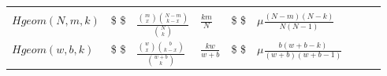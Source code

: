 \documentclass[]{tufte-book}
\begin{document}
\begin{longtable}[]{@{}lllllllll@{}}
\begin{minipage}[t]{0.08\columnwidth}
\strut
\end{minipage}\tabularnewline
\begin{minipage}[t]{0.08\columnwidth}\raggedright
\(Hgeom(N,m,k)\)\strut
\end{minipage} & \begin{minipage}[t]{0.08\columnwidth}\raggedright
\$ \$\strut
\end{minipage} & \begin{minipage}[t]{0.08\columnwidth}\raggedright
\(\frac{\binom{m}{x}\binom{N-m}{k-x}}{\binom{N}{k}}\)\strut
\end{minipage} & \begin{minipage}[t]{0.08\columnwidth}\raggedright
\(\frac{km}{N}\)\strut
\end{minipage} & \begin{minipage}[t]{0.08\columnwidth}\raggedright
\$ \$\strut
\end{minipage} & \begin{minipage}[t]{0.08\columnwidth}\raggedright
\(\mu\frac{(N-m)(N-k)}{N(N-1)}\)\strut
\end{minipage} & \begin{minipage}[t]{0.08\columnwidth}\raggedright
\strut
\end{minipage} & \begin{minipage}[t]{0.08\columnwidth}\raggedright
\strut
\end{minipage} & \begin{minipage}[t]{0.08\columnwidth}\raggedright
\strut
\end{minipage}\tabularnewline
\begin{minipage}[t]{0.08\columnwidth}\raggedright
\(Hgeom(w,b,k)\)\strut
\end{minipage} & \begin{minipage}[t]{0.08\columnwidth}\raggedright
\$ \$\strut
\end{minipage} & \begin{minipage}[t]{0.08\columnwidth}\raggedright
\(\frac{\binom{w}{x}\binom{b}{k-x}}{\binom{w+b}{k}}\)\strut
\end{minipage} & \begin{minipage}[t]{0.08\columnwidth}\raggedright
\(\frac{kw}{w+b}\)\strut
\end{minipage} & \begin{minipage}[t]{0.08\columnwidth}\raggedright
\$ \$\strut
\end{minipage} & \begin{minipage}[t]{0.08\columnwidth}\raggedright
\(\mu\frac{b(w+b-k)}{(w+b)(w+b-1)}\)\strut

\end{minipage}
\end{longtable}
\end{document}
